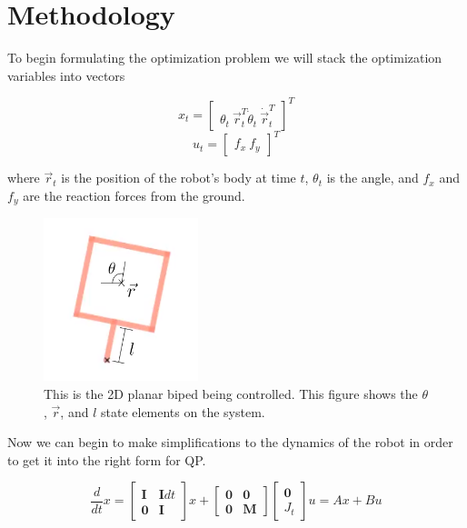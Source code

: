 \documentclass[conference]{IEEEtran}
\begin{document}
\section{Methodology}
\label{sec:methodology}

To begin formulating the optimization problem we will stack the optimization variables into vectors

\[x_t = \begin{bmatrix} \theta_t\: \vec{r}^T_t \dot{\theta}_t\: \dot{\vec{r}}^T_t \end{bmatrix}^T\]
\[u_t = \begin{bmatrix} f_x\: f_y\end{bmatrix}^T\]

where \(\vec{r}_t\) is the position of the robot's body at time \(t\), \(\theta_t\) is the angle, and \(f_x\) and \(f_y\) are the reaction forces from the ground.

\begin{figure}[h!]
    \centering
    \includegraphics[width=0.4\textwidth]{robot.png}
    \caption{
        This is the 2D planar biped being controlled.
        This figure shows the \(\theta\), \(\vec{r}\), and \(l\) state elements on the system.
    }
    \label{fig:robot}
\end{figure}


Now we can begin to make simplifications to the dynamics of the robot in order to get it into the right form for QP.

\[\frac{d}{dt}x=\begin{bmatrix} \mathbf{I} & \mathbf{I}dt \\ \mathbf{0} & \mathbf{I} \end{bmatrix} x + \begin{bmatrix} \mathbf{0} & \mathbf{0} \\ \mathbf{0} & \mathbf{M} \end{bmatrix} \begin{bmatrix} \mathbf{0} \\ J_t \end{bmatrix} u = Ax + Bu \]
\end{document}
